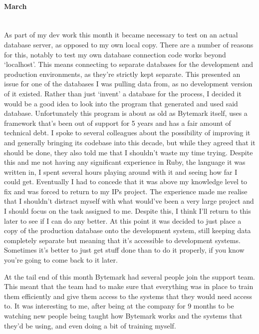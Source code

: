 \documentclass[12pt,a4paper]{article}
\newcommand{\paragraphnl}[1]{\paragraph{#1}\mbox{}\\}
\begin{document}
\paragraphnl{March}
	As part of my dev work this month it became necessary to test on an actual
	database server, as opposed to my own local copy. There are a number of
	reasons for this, notably to test my own database connection code works
	beyond `localhost'. This means connecting to separate databases for the
	development and production environments, as they're strictly kept separate.
	This presented an issue for one of the databases I was pulling data from, as
	no development version of it existed. Rather than just `invent' a database
	for the process, I decided it would be a good idea to look into the program
	that generated and used said database. Unfortunately this program is about
	as old as Bytemark itself, uses a framework that's been out of support for 5
	years and has a fair amount of technical debt. I spoke to several colleagues
	about the possibility of improving it and generally bringing its codebase
	into this decade, but while they agreed that it should be done, they also
	told me that I shouldn't waste my time trying. Despite this and me not
	having any significant experience in Ruby, the language it was written in, I
	spent several hours playing around with it and seeing how far I could get.
	Eventually I had to concede that it was above my knowledge level to fix and
	was forced to return to my IPs project. The experience made me realise that
	I shouldn't distract myself with what would've been a very large project and
	I should focus on the task assigned to me. Despite this, I think I'll return
	to this later to see if I can do any better. At this point it was decided to
	just place a copy of the production database onto the development system,
	still keeping data completely separate but meaning that it's accessible to
	development systems. Sometimes it's better to just get stuff done than to do
	it properly, if you know you're going to come back to it later.

	At the tail end of this month Bytemark had several people join the support
	team. This meant that the team had to make sure that everything was in place
	to train them efficiently and give them access to the systems that they
	would need access to. It was interesting to me, after being at the company
	for 9 months to be watching new people being taught how Bytemark works and
	the systems that they'd be using, and even doing a bit of training myself.
\end{document}

